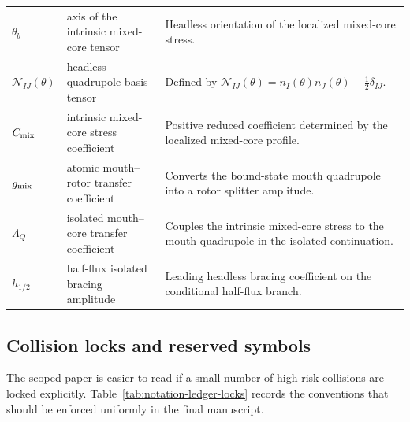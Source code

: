\documentclass[11pt]{article}
\theoremstyle{plain}
\theoremstyle{definition}
\theoremstyle{remark}
\begin{document}
\begin{table}[t]
\begin{tabularx}{\textwidth}{@{}>{\raggedright\arraybackslash}p{} >{\raggedright\arraybackslash}p{} X@{}}
$\theta_b$ & axis of the intrinsic mixed-core tensor & Headless orientation of the localized mixed-core stress. \\
$\mathcal N_{IJ}(\theta)$ & headless quadrupole basis tensor & Defined by $\mathcal N_{IJ}(\theta)=n_I(\theta)n_J(\theta)-\tfrac12\delta_{IJ}$. \\
$C_{\rm mix}$ & intrinsic mixed-core stress coefficient & Positive reduced coefficient determined by the localized mixed-core profile. \\
$g_{\rm mix}$ & atomic mouth--rotor transfer coefficient & Converts the bound-state mouth quadrupole into a rotor splitter amplitude. \\
$\Lambda_Q$ & isolated mouth--core transfer coefficient & Couples the intrinsic mixed-core stress to the mouth quadrupole in the isolated continuation. \\
$h_{1/2}$ & half-flux isolated bracing amplitude & Leading headless bracing coefficient on the conditional half-flux branch. \\
\bottomrule
\end{tabularx}
\end{table}

\subsection{Collision locks and reserved symbols}\label{subsec:notation-ledger-locks}

The scoped paper is easier to read if a small number of high-risk collisions are locked explicitly. Table~\ref{tab:notation-ledger-locks} records the conventions that should be enforced uniformly in the final manuscript.
\end{document}
